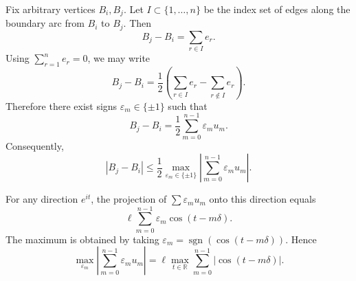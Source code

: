\documentclass{article}
\theoremstyle{definition}
\let\le\leqslant
\begin{document}
Fix arbitrary vertices $B_i,B_j$.
Let $I\subset\{1,\dots,n\}$ be the index set of edges along the boundary arc
from $B_i$ to $B_j$.
Then
\[
B_j - B_i = \sum_{r\in I} e_r.
\]
Using $\sum_{r=1}^n e_r=0$, we may write
\[
B_j - B_i
=
\frac12
\left(
\sum_{r\in I} e_r - \sum_{r\notin I} e_r
\right).
\]
Therefore there exist signs $\varepsilon_m\in\{\pm1\}$ such that
\[
B_j - B_i
=
\frac12
\sum_{m=0}^{n-1}
\varepsilon_m u_m.
\]
Consequently,
\[
|B_j - B_i|
\le
\frac12
\max_{\varepsilon_m\in\{\pm1\}}
\left|
\sum_{m=0}^{n-1}
\varepsilon_m u_m
\right|.
\]

For any direction $e^{it}$,
the projection of $\sum \varepsilon_m u_m$ onto this direction equals
\[
\ell \sum_{m=0}^{n-1}
\varepsilon_m \cos(t-m\delta).
\]
The maximum is obtained by taking
$\varepsilon_m = \operatorname{sgn}(\cos(t-m\delta))$.
Hence
\[
\max_{\varepsilon_m}
\left|
\sum_{m=0}^{n-1}
\varepsilon_m u_m
\right|
=
\ell
\max_{t\in\mathbb{R}}
\sum_{m=0}^{n-1}
|\cos(t-m\delta)|.
\]
\end{document}
